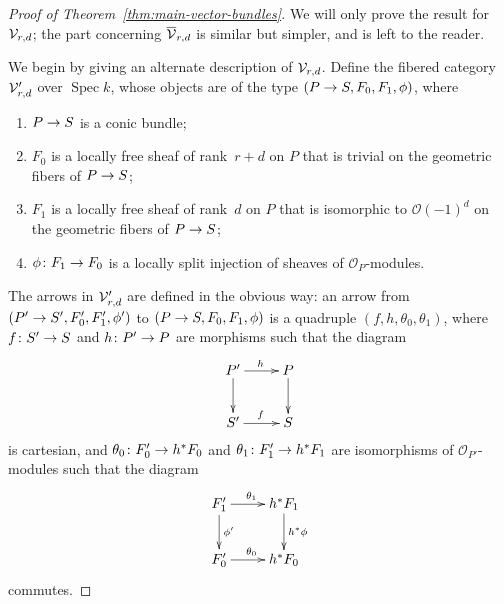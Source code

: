 \documentclass{amsart}
\numberwithin{equation}{section}
\numberwithin{subsection}{section}
\newenvironment{enumeratea}
{\begin{enumerate}[\upshape (a)]}
{\end{enumerate}}
\theoremstyle{definition}
\theoremstyle{remark}
\newcommand\cO{\mathcal{O}} \newcommand\cP{\mathcal{P}}
\newcommand\arr{\ifinner\to\else\longrightarrow\fi}
\newcommand\spec{\operatorname{Spec}}
\newcommand{\vectp}[1][r,d]{\overline{\cV}_{#1}}
\newcommand{\vect}[1][r,d]{\cV_{#1}}
\newcommand{\vectalt}[1][r,d]{\cV'_{#1}}
\begin{document}
\begin{proof}[Proof of Theorem~\ref{thm:main-vector-bundles}]
We will only prove the result for $\vect$; the part concerning $\vectp$ is similar but simpler, and is left to the reader.

We begin by giving an alternate description of $\vect$. Define the fibered category $\vectalt$ over $\spec k$, whose objects are of the type $(P \arr S, F_{0}, F_{1}, \phi)$, where
\begin{enumeratea}

\item $P \arr S$ is a conic bundle;

\item $F_{0}$ is a locally free sheaf of rank~$r+d$ on $P$ that is trivial on the geometric fibers of $P \arr S$;

\item $F_{1}$ is a locally free sheaf of rank~$d$ on $P$ that is isomorphic to $\cO(-1)^{d}$ on the geometric fibers of $P \arr S$;

\item $\phi\colon F_{1} \arr F_{0}$ is a locally split injection of sheaves of $\cO_{P}$-modules.

\end{enumeratea}

The arrows in $\vectalt$ are defined in the obvious way: an arrow from $(P' \arr S', F'_{0}, F'_{1}, \phi')$ to $(P \arr S, F_{0}, F_{1}, \phi)$ is a quadruple $(f, h, \theta_{0}, \theta_{1})$, where $f\colon S' \arr S$ and $h \colon P' \arr P$ are morphisms such that the diagram
   \[
   \xymatrix{
   P' \ar[r]^{h}\ar[d] & P\ar[d]\\
   S' \ar[r]^{f} & S
   }
   \]
is cartesian, and $\theta_{0}\colon F'_{0} \arr h^{*}F_{0}$ and $\theta_{1}\colon F'_{1} \arr h^{*}F_{1}$ are isomorphisms of $\cO_{P'}$-modules such that the diagram
   \[
   \xymatrix{
   F'_{1} \ar[r]^{\theta_{1}}\ar[d]^{\phi'} & h^{*}F_{1} \ar[d]^{h^{*}\phi}\\
   F'_{0} \ar[r]^{\theta_{0}} & h^{*}F_{0}
   }
   \]
commutes.


\end{proof}
\end{document}
